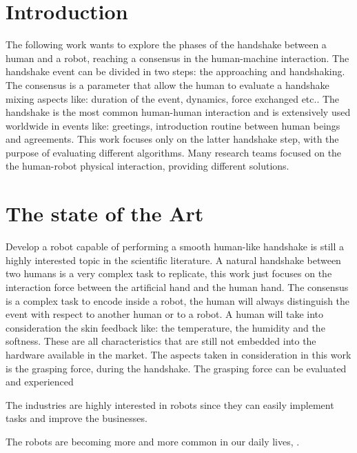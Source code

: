 \chapter*{Introduction}
The following work wants to explore the phases of the handshake between a human and a robot, reaching a consensus in the human-machine interaction. The handshake event can be divided in two steps: the approaching and handshaking. The consensus is a parameter that allow the human to evaluate a handshake mixing aspects like: duration of the event, dynamics, force exchanged etc.. 
The handshake is the most common human-human interaction and is extensively used worldwide in events like: greetings, introduction routine between human beings and agreements. 
This work focuses only on the latter handshake step, with the purpose of evaluating different algorithms.
Many research teams focused on the the human-robot physical interaction, providing different solutions. 


\chapter{The state of the Art}
Develop a robot capable of performing a smooth human-like handshake is still a highly interested topic in the scientific literature.
A natural handshake between two humans is a very complex task to replicate, this work just focuses on the interaction force between the artificial hand and the human hand.
The consensus is a complex task to encode inside a robot, the human will always distinguish the event with respect to another human or to a robot. A human will take into consideration the skin feedback like: the temperature, the humidity and the softness. These are all characteristics that are still not embedded into the hardware available in the market. The aspects taken in consideration in this work is the grasping force, during the handshake. The grasping force can be evaluated and experienced 

The industries are highly interested in robots since they can easily implement tasks and improve the businesses.

\cite{facialexpressions}
\cite{espen}
\cite{mirrorgame}
\cite{papageorgiou}
The robots are becoming more and more common in our daily lives, 
.
\section{}
\section{}

